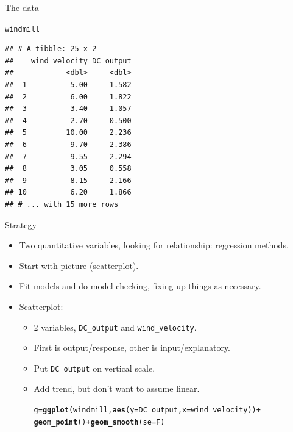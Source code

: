 \documentclass[unknownkeysallowed]{beamer}\usepackage[]{graphicx}\usepackage[]{color}
\makeatletter
\newcommand{\hlopt}[1]{\textcolor[rgb]{0,0,0}{#1}}%
\newcommand{\hlstd}[1]{\textcolor[rgb]{0.345,0.345,0.345}{#1}}%
\newcommand{\hlkwb}[1]{\textcolor[rgb]{0.69,0.353,0.396}{#1}}%
\newcommand{\hlkwc}[1]{\textcolor[rgb]{0.333,0.667,0.333}{#1}}%
\newcommand{\hlkwd}[1]{\textcolor[rgb]{0.737,0.353,0.396}{\textbf{#1}}}%
\newenvironment{kframe}{%
 \def\at@end@of@kframe{}%
 \ifinner\ifhmode%
  \def\at@end@of@kframe{\end{minipage}}%
  \begin{minipage}{\columnwidth}%
 \fi\fi%
 \def\FrameCommand##1{\hskip\@totalleftmargin \hskip-\fboxsep
 \colorbox{shadecolor}{##1}\hskip-\fboxsep
     \hskip-\linewidth \hskip-\@totalleftmargin \hskip\columnwidth}%
 \MakeFramed {\advance\hsize-\width
   \@totalleftmargin\z@ \linewidth\hsize
   \@setminipage}}%
 {\par\unskip\endMakeFramed%
 \at@end@of@kframe}
\newenvironment{knitrout}{}{} %
\makeatother
\begin{document}
\begin{frame}[fragile]{The data}
  
\begin{knitrout}
\color{fgcolor}\begin{kframe}
\begin{alltt}
\hlstd{windmill}
\end{alltt}
\begin{verbatim}
## # A tibble: 25 x 2
##    wind_velocity DC_output
##            <dbl>     <dbl>
##  1          5.00     1.582
##  2          6.00     1.822
##  3          3.40     1.057
##  4          2.70     0.500
##  5         10.00     2.236
##  6          9.70     2.386
##  7          9.55     2.294
##  8          3.05     0.558
##  9          8.15     2.166
## 10          6.20     1.866
## # ... with 15 more rows
\end{verbatim}
\end{kframe}
\end{knitrout}
  
\end{frame}


\begin{frame}[fragile]{Strategy}

  \begin{itemize}
  \item Two quantitative variables, looking for relationship:
    regression methods.
  \item Start with picture (scatterplot).
  \item Fit models and do model checking, fixing up things as necessary.
  \item Scatterplot:
    \begin{itemize}
    \item 2 variables, \texttt{DC\_output} and \texttt{wind\_velocity}.
    \item First is output/response, other is input/explanatory.
    \item Put \texttt{DC\_output} on vertical scale.
    \item Add trend, but don't want to assume linear.


\begin{knitrout}
\color{fgcolor}\begin{kframe}
\begin{alltt}
\hlstd{g}\hlkwb{=}\hlkwd{ggplot}\hlstd{(windmill,}\hlkwd{aes}\hlstd{(}\hlkwc{y}\hlstd{=DC_output,}\hlkwc{x}\hlstd{=wind_velocity))}\hlopt{+}
  \hlkwd{geom_point}\hlstd{()}\hlopt{+}\hlkwd{geom_smooth}\hlstd{(}\hlkwc{se}\hlstd{=F)}
\end{alltt}
\end{kframe}
\end{knitrout}
    \end{itemize}
  

  \end{itemize}


\end{frame}
\end{document}
